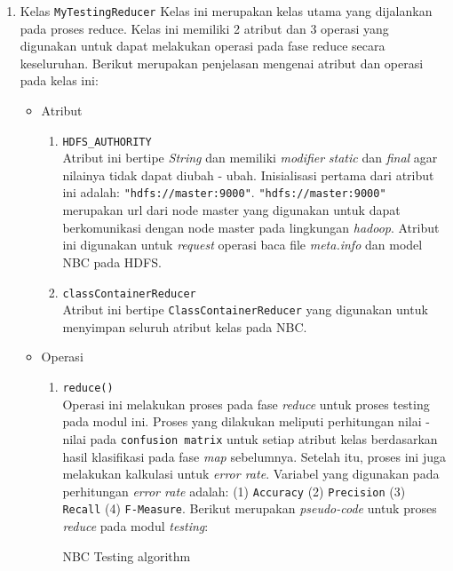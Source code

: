 \begin{enumerate}
	\item Kelas \texttt{MyTestingReducer}
	Kelas ini merupakan kelas utama yang dijalankan pada proses reduce. Kelas ini memiliki 2 atribut dan 3 operasi yang digunakan untuk dapat melakukan operasi pada fase reduce secara keseluruhan. Berikut merupakan penjelasan mengenai atribut dan operasi pada kelas ini:
	\begin{itemize}
		\item{Atribut}
		\begin{enumerate}
			\item{\verb|HDFS_AUTHORITY|}\\
			Atribut ini bertipe \textit{String} dan memiliki \textit{modifier} \textit{static} dan \textit{final} agar nilainya tidak dapat diubah - ubah. Inisialisasi pertama dari atribut ini adalah: \verb|"hdfs://master:9000"|. \verb|"hdfs://master:9000"| merupakan url dari node master yang digunakan untuk dapat berkomunikasi dengan node master pada lingkungan \textit{hadoop}. Atribut ini digunakan untuk \textit{request} operasi baca file \textit{meta.info} dan model NBC pada HDFS.
		
			\item{\texttt{classContainerReducer}}\\
			Atribut ini bertipe \texttt{ClassContainerReducer} yang digunakan untuk menyimpan seluruh atribut kelas pada NBC. 
			
		\end{enumerate}
		
		\item{Operasi}
		\begin{enumerate}
			\item{\texttt{reduce()}}\\
			Operasi ini melakukan proses pada fase \textit{reduce} untuk proses testing pada modul ini. Proses yang dilakukan meliputi perhitungan nilai - nilai pada \texttt{confusion matrix} untuk setiap atribut kelas berdasarkan hasil klasifikasi pada fase \textit{map} sebelumnya. Setelah itu, proses ini juga melakukan kalkulasi untuk \textit{error rate}. Variabel yang digunakan pada perhitungan \textit{error rate} adalah: (1) \texttt{Accuracy} (2) \texttt{Precision} (3) \texttt{Recall} (4) \texttt{F-Measure}. Berikut merupakan \textit{pseudo-code} untuk proses \textit{reduce} pada modul \textit{testing}:
			\begin{algorithm}[H]
			\caption{NBC Testing algorithm}\label{alg:NBCTestMap}
			\begin{algorithmic}[1]
			

\end{algorithmic}
\end{algorithm}
\end{enumerate}
\end{itemize}
\end{enumerate}
